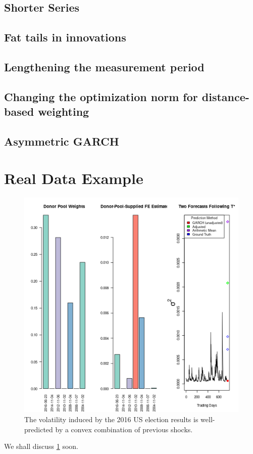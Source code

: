 \documentclass[11pt]{article}
\theoremstyle{definition}
\begin{document}
\subsection{Shorter Series}

\subsection{Fat tails in innovations}

\subsection{Lengthening the measurement period}

\subsection{Changing the optimization norm for distance-based weighting}

\subsection{Asymmetric GARCH}

\section{Real Data Example}

\begin{figure}[h!]
\begin{center}
  \includegraphics[scale=.38]{R_package_development/SynthVolForecast/R/SVF_2016_without_pound.png}
  \caption{The volatility induced by the 2016 US election results is well-predicted by a convex combination of previous shocks.}
  \label{fig:SVF_2016}
  \end{center}
\end{figure}
We shall discuss \ref{fig:SVF_2016} soon.
\end{document}
